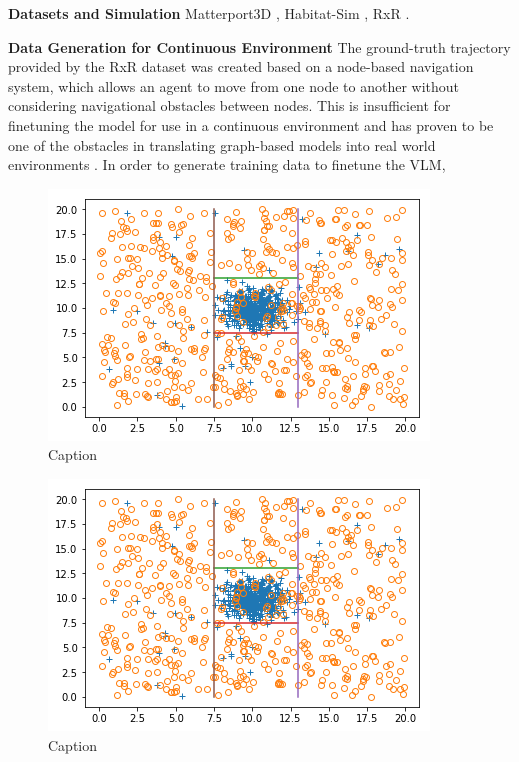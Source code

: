 \documentclass{svproc}
\begin{document}
    \textbf{Datasets and Simulation}  Matterport3D \cite{Matterport3D}, Habitat-Sim \cite{habitat19iccv, szot2021habitat, puig2023habitat3}, RxR \cite{rxr}.

    \textbf{Data Generation for Continuous Environment}  The ground-truth trajectory provided by the RxR dataset was created based on a node-based navigation system, which allows an agent to move from one node to another without considering navigational obstacles between nodes. This is insufficient for finetuning the model for use in a continuous environment and has proven to be one of the obstacles in translating graph-based models into real world environments \cite{pmlr-v155-anderson21a}. In order to generate training data to finetune the VLM, 

    

    \begin{figure}
        \centering
        \includegraphics[scale=.75]{figures/DecisionBoundary.png}
        \caption{Caption}
        \label{fig:fig2}
    \end{figure}

    
    \begin{figure}
        \centering
        \includegraphics[scale=.75]{figures/DecisionBoundary.png}
        \caption{Caption}
        \label{fig:my_label}
    \end{figure}
\end{document}
